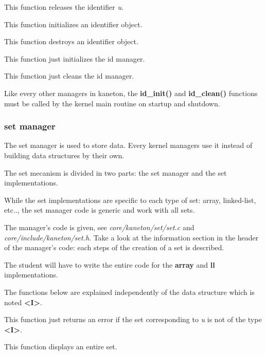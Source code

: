 	  {This function releases the identifier \textit{u}.}

	  {This function initializes an identifier object.}

	  {This function destroys an identifier object.}

	  {This function just initializes the id manager.}

	  {This function just cleans the id manager.}

Like every other managers in kaneton, the \textbf{id\_init()} and
\textbf{id\_clean()} functions must be called by the kernel main
routine on startup and shutdown.

%
%

\subsubsection{set manager}

The set  manager is used to store data. Every kernel managers use it
instead of building data structures by their own.

The set mecanism is divided in two parts: the set manager and the set
implementations.

While the set implementations are specific to each type of set: array,
linked-list, etc.., the set manager code is generic and work with all
sets.

The manager's code is given, see \textit{core/kaneton/set/set.c} and
\textit{core/include/kaneton/set.h}. Take a look at the information
section in the header of the manager's code: each steps of the creation
of a set is described.

The student will have to write the entire code for the \textbf{array}
and \textbf{ll} implementations.

The functions below are explained independently of the data structure
which is noted \textbf{<I>}.

	  {This function just returns an error if the set corresponding
	    to \textit{u} is not of the type \textbf{<I>}.}

	  {This function displays an entire set.}

